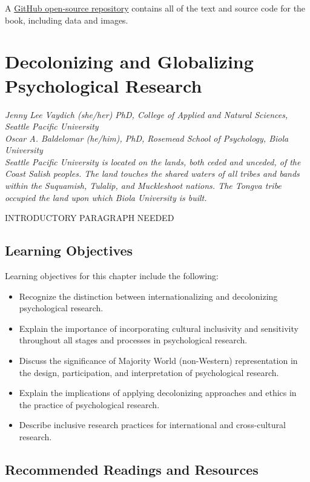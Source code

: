 \documentclass[
  11pt,
]{book}
\providecommand{\tightlist}{%
  \setlength{\itemsep}{0pt}\setlength{\parskip}{0pt}}
\begin{document}
A \href{https://github.com/lhbikos/TransformingResearchMethods}{GitHub open-source repository} contains all of the text and source code for the book, including data and images.

\chapter{Decolonizing and Globalizing Psychological Research}\label{Decol}

\emph{Jenny Lee Vaydich (she/her) PhD, College of Applied and Natural Sciences, Seattle Pacific University}\\
\emph{Oscar A. Baldelomar (he/him), PhD, Rosemead School of Psychology, Biola University}\\

\emph{Seattle Pacific University is located on the lands, both ceded and unceded, of the Coast Salish peoples. The land touches the shared waters of all tribes and bands within the Suquamish, Tulalip, and Muckleshoot nations. The Tongva tribe occupied the land upon which Biola University is built.}~

INTRODUCTORY PARAGRAPH NEEDED

\section{Learning Objectives}\label{learning-objectives}

Learning objectives for this chapter include the following:

\begin{itemize}
\tightlist
\item
  Recognize the distinction between internationalizing and decolonizing psychological research.
\item
  Explain the importance of incorporating cultural inclusivity and sensitivity throughout all stages and processes in psychological research.
\item
  Discuss the significance of Majority World (non-Western) representation in the design, participation, and interpretation of psychological research.
\item
  Explain the implications of applying decolonizing approaches and ethics in the practice of psychological research.
\item
  Describe inclusive research practices for international and cross-cultural research.
\end{itemize}

\section{Recommended Readings and Resources}\label{recommended-readings-and-resources}
\end{document}
